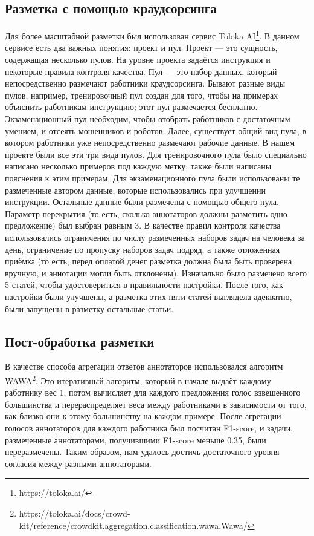 \documentclass[conference]{IEEEtran}
\begin{document}
\subsection{Разметка с помощью краудсорсинга}
Для более масштабной разметки был использован сервис Toloka AI\footnote{https://toloka.ai/}. В данном сервисе есть два важных понятия: проект и пул. Проект --- это сущность, содержащая несколько пулов. На уровне проекта задаётся инструкция и некоторые правила контроля качества. Пул --- это набор данных, который непосредственно размечают работники краудсорсинга. Бывают разные виды пулов, например, тренировочный пул создан для того, чтобы на примерах объяснить работникам инструкцию; этот пул размечается бесплатно. Экзаменационный пул необходим, чтобы отобрать работников с достаточным умением, и отсеять мошенников и роботов. Далее, существует общий вид пула, в котором работники уже непосредственно размечают рабочие данные. В нашем проекте были все эти три вида пулов. Для тренировочного пула было специально написано несколько примеров под каждую метку; также были написаны пояснения к этим примерам. Для экзаменационного пула были использованы те размеченные автором данные, которые использовались при улучшении инструкции. Остальные данные были размечены с помощью общего пула. Параметр перекрытия (то есть, сколько аннотаторов должны разметить одно предложение) был выбран равным 3. В качестве правил контроля качества использовались ограничения по числу размеченных наборов задач на человека за день, ограничение по пропуску наборов задач подряд, а также отложенная приёмка (то есть, перед оплатой денег разметка должна была быть проверена вручную, и аннотации могли быть отклонены). Изначально было размечено всего 5 статей, чтобы удостовериться в правильности настройки. После того, как настройки были улучшены, а разметка этих пяти статей выглядела адекватно, были запущены в разметку остальные статьи.

\subsection{Пост-обработка разметки}
В качестве способа агрегации ответов аннотаторов использовался алгоритм WAWA\footnote{https://toloka.ai/docs/crowd-kit/reference/crowdkit.aggregation.classification.wawa.Wawa/}. Это итеративный алгоритм, который в начале выдаёт каждому работнику вес 1, потом вычисляет для каждого предложения голос взвешенного большинства и перераспределяет веса между работниками в зависимости от того, как близко они к этому большинству на каждом примере. После агрегации голосов аннотаторов для каждого работника был посчитан F1-score, и задачи, размеченные аннотаторами, получившими F1-score меньше 0.35, были переразмечены. Таким образом, нам удалось достичь достаточного уровня согласия между разными аннотаторами.
\end{document}
